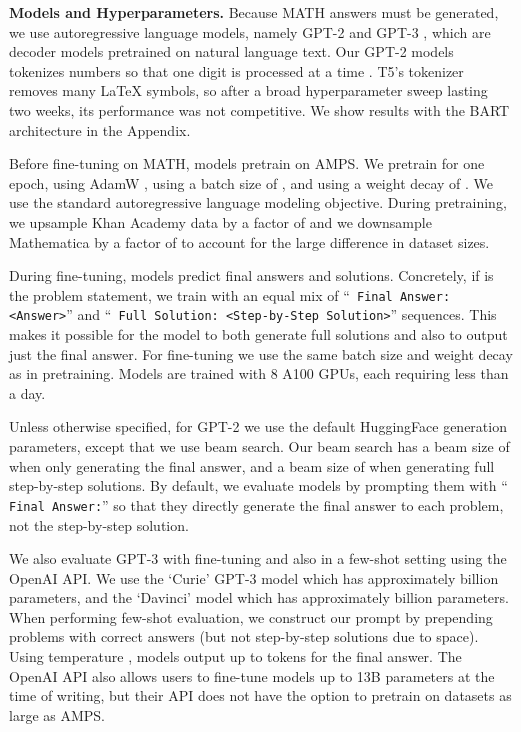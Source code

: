 \documentclass{article}
\begin{document}
\textbf{Models and Hyperparameters.}\quad
Because MATH answers must be generated, we use autoregressive language models, namely GPT-2 \citep{Radford2016UnsupervisedRL} and GPT-3 \citep{Brown2020LanguageMA}, which are decoder models pretrained on natural language text. Our GPT-2 models tokenizes numbers so that one digit is processed at a time \citep{Henighan2020ScalingLF}.
T5's \citep{Raffel2020ExploringTL} tokenizer removes many \LaTeX{} symbols, so after a broad hyperparameter sweep lasting two weeks, its performance was not competitive. We show results with the BART architecture in the Appendix.


Before fine-tuning on MATH, models pretrain on AMPS.
We pretrain for one epoch, using AdamW \citep{Loshchilov2019DecoupledWD}, using a batch size of , and using a weight decay of . We use the standard autoregressive language modeling objective.
During pretraining, we upsample Khan Academy data by a factor of  and we downsample Mathematica by a factor of  to account for the large difference in dataset sizes.

During fine-tuning, models predict final answers and solutions. Concretely, if  is the problem statement, we train with an equal mix of ``\texttt{ Final Answer: <Answer>}'' and ``\texttt{ Full Solution: <Step-by-Step Solution>}'' sequences. This makes it possible for the model to both generate full solutions and also to output just the  final answer. For fine-tuning we use the same batch size and weight decay as in pretraining. Models are trained with 8 A100 GPUs, each requiring less than a day.

Unless otherwise specified, for GPT-2 we use the default HuggingFace \citep{wolf-etal-2020-transformers} generation parameters, except that we use beam search. Our beam search has a beam size of  when only generating the final answer, and a beam size of  when generating full step-by-step solutions. By default, we evaluate models by prompting them with ``\texttt{ Final Answer:}'' so that they directly generate the final answer to each problem, not the step-by-step solution.

We also evaluate GPT-3 with fine-tuning and also in a few-shot setting using the OpenAI API. We use the `Curie' GPT-3 model which has approximately  billion parameters, and the `Davinci' model which has approximately  billion parameters. When performing few-shot evaluation, we construct our prompt by prepending  problems with correct answers (but not step-by-step solutions due to space). Using temperature , models output up to  tokens for the final answer. The OpenAI API also allows users to fine-tune models up to 13B parameters at the time of writing, but their API does not have the option to pretrain on datasets as large as AMPS. 
\end{document}
